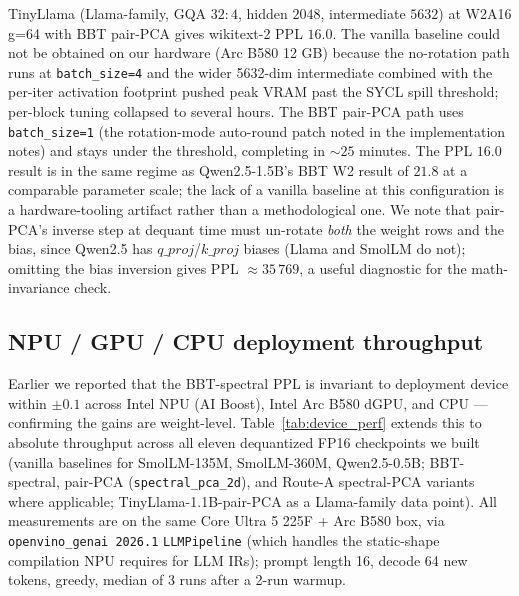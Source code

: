 \documentclass[11pt]{article}
\begin{document}
TinyLlama (Llama-family, GQA $32{:}4$, hidden $2048$, intermediate $5632$) at W2A16 g=64 with BBT pair-PCA gives wikitext-2 PPL $16.0$. The vanilla baseline could not be obtained on our hardware (Arc B580 12 GB) because the no-rotation path runs at \texttt{batch\_size=4} and the wider 5632-dim intermediate combined with the per-iter activation footprint pushed peak VRAM past the SYCL spill threshold; per-block tuning collapsed to several hours. The BBT pair-PCA path uses \texttt{batch\_size=1} (the rotation-mode auto-round patch noted in the implementation notes) and stays under the threshold, completing in $\sim 25$ minutes. The PPL $16.0$ result is in the same regime as Qwen2.5-1.5B's BBT W2 result of $21.8$ at a comparable parameter scale; the lack of a vanilla baseline at this configuration is a hardware-tooling artifact rather than a methodological one. We note that pair-PCA's inverse step at dequant time must un-rotate \emph{both} the weight rows and the bias, since Qwen2.5 has $q\_proj$/$k\_proj$ biases (Llama and SmolLM do not); omitting the bias inversion gives PPL $\approx 35\,769$, a useful diagnostic for the math-invariance check.

\subsection{NPU / GPU / CPU deployment throughput}
\label{sec:device_perf}

Earlier we reported that the BBT-spectral PPL is invariant to deployment device within $\pm 0.1$ across Intel NPU (AI Boost), Intel Arc B580 dGPU, and CPU --- confirming the gains are weight-level. Table~\ref{tab:device_perf} extends this to absolute throughput across all eleven dequantized FP16 checkpoints we built (vanilla baselines for SmolLM-135M, SmolLM-360M, Qwen2.5-0.5B; BBT-spectral, pair-PCA (\texttt{spectral\_pca\_2d}), and Route-A spectral-PCA variants where applicable; TinyLlama-1.1B-pair-PCA as a Llama-family data point). All measurements are on the same Core Ultra 5 225F + Arc B580 box, via \texttt{openvino\_genai 2026.1} \texttt{LLMPipeline} (which handles the static-shape compilation NPU requires for LLM IRs); prompt length 16, decode 64 new tokens, greedy, median of 3 runs after a 2-run warmup.
\end{document}
